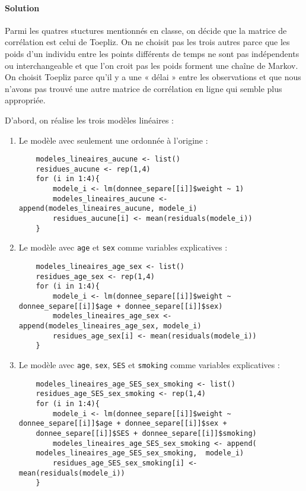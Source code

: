 \documentclass[../main.tex]{subfiles}
\begin{document}
\begin{CJK*}{UTF8}{gbsn}
\paragraph{Solution}

Parmi les quatres stuctures mentionnés en classe, on décide que la matrice de corrélation 
est celui de Toepliz. On ne choisit pas les trois autres parce que les poids d'un individu 
entre les points différents de temps ne sont pas indépendents ou interchangeable et que l'on 
croit pas les poids forment une chaîne de Markov. On choisit Toepliz parce qu'il y a une « délai »
entre les observations et que nous n'avons pas trouvé une autre matrice de corrélation en ligne 
qui semble plus appropriée.

D'abord, on réalise les trois modèles linéaires :

\begin{enumerate}
    \item Le modèle avec seulement une ordonnée à l'origine :

\begin{lstlisting}
    modeles_lineaires_aucune <- list()
    residues_aucune <- rep(1,4)
    for (i in 1:4){
        modele_i <- lm(donnee_separe[[i]]$weight ~ 1)
        modeles_lineaires_aucune <- append(modeles_lineaires_aucune, modele_i)
        residues_aucune[i] <- mean(residuals(modele_i))
    }
\end{lstlisting}

    \item Le modèle avec \texttt{age} et \texttt{sex} comme variables explicatives :

\begin{lstlisting}
    modeles_lineaires_age_sex <- list()
    residues_age_sex <- rep(1,4)
    for (i in 1:4){
        modele_i <- lm(donnee_separe[[i]]$weight ~ donnee_separe[[i]]$age + donnee_separe[[i]]$sex)
        modeles_lineaires_age_sex <- append(modeles_lineaires_age_sex, modele_i)
        residues_age_sex[i] <- mean(residuals(modele_i))
    }
\end{lstlisting}

    \item Le modèle avec \texttt{age}, \texttt{sex}, \texttt{SES} et \texttt{smoking} comme variables explicatives : 

\begin{lstlisting}
    modeles_lineaires_age_SES_sex_smoking <- list()
    residues_age_SES_sex_smoking <- rep(1,4)
    for (i in 1:4){
        modele_i <- lm(donnee_separe[[i]]$weight ~ donnee_separe[[i]]$age + donnee_separe[[i]]$sex + 
    donnee_separe[[i]]$SES + donnee_separe[[i]]$smoking)
        modeles_lineaires_age_SES_sex_smoking <- append(
    modeles_lineaires_age_SES_sex_smoking,  modele_i)
        residues_age_SES_sex_smoking[i] <- mean(residuals(modele_i))
    }
    \end{lstlisting}   
\end{enumerate}


\end{CJK*}
\end{document}
